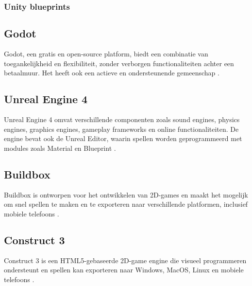 \subsubsection{Unity blueprints}

\subsection{Godot}
Godot, een gratis en open-source platform, biedt een combinatie van toegankelijkheid en flexibiliteit, zonder verborgen functionaliteiten achter een betaalmuur. Het heeft ook een actieve en ondersteunende gemeenschap \autocite{Bradfield2018}.

\subsection{Unreal Engine 4}
Unreal Engine 4 omvat verschillende componenten zoals sound engines, physics engines, graphics engines, gameplay frameworks en online functionaliteiten. De engine bevat ook de Unreal Editor, waarin spellen worden geprogrammeerd met modules zoals Material en Blueprint \autocite{lee2016learning}.

\subsection{Buildbox}
Buildbox is ontworpen voor het ontwikkelen van 2D-games en maakt het mogelijk om snel spellen te maken en te exporteren naar verschillende platformen, inclusief mobiele telefoons \cite{audronis2016buildbox}.

\subsection{Construct 3}
Construct 3 is een HTML5-gebaseerde 2D-game engine die visueel programmeren ondersteunt en spellen kan exporteren naar Windows, MacOS, Linux en mobiele telefoons \cite{enwiki:1200994136}.